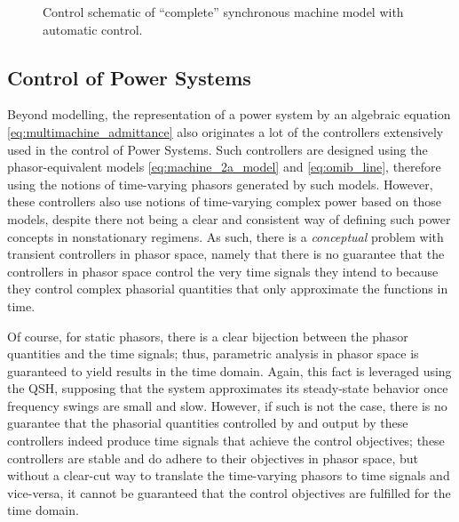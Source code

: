 \begin{figure}
{
}
	\caption{Control schematic of ``complete'' synchronous machine model with automatic control.}
	\label{fig:machine_model_controls}
\end{figure} %

\subsection{Control of Power Systems} \label{subsec:power_system_control}%

	Beyond modelling, the representation of a power system by an algebraic equation \ref{eq:multimachine_admittance} also originates a lot of the controllers extensively used in the control of Power Systems. Such controllers are designed using the phasor-equivalent models \eqref{eq:machine_2a_model} and \eqref{eq:omib_line}, therefore using the notions of time-varying phasors generated by such models. However, these controllers also use notions of time-varying complex power based on those models, despite there not being a clear and consistent way of defining such power concepts in nonstationary regimens. As such, there is a \textit{conceptual} problem with transient controllers in phasor space, namely that there is no guarantee that the controllers in phasor space control the very time signals they intend to because they control complex phasorial quantities that only approximate the functions in time.

	Of course, for static phasors, there is a clear bijection between the phasor quantities and the time signals; thus, parametric analysis in phasor space is guaranteed to yield results in the time domain. Again, this fact is leveraged using the QSH, supposing that the system approximates its steady-state behavior once frequency swings are small and slow. However, if such is not the case, there is no guarantee that the phasorial quantities controlled by and output by these controllers indeed produce time signals that achieve the control objectives; these controllers are stable and do adhere to their objectives in phasor space, but without a clear-cut way to translate the time-varying phasors to time signals and vice-versa, it cannot be guaranteed that the control objectives are fulfilled for the time domain.

